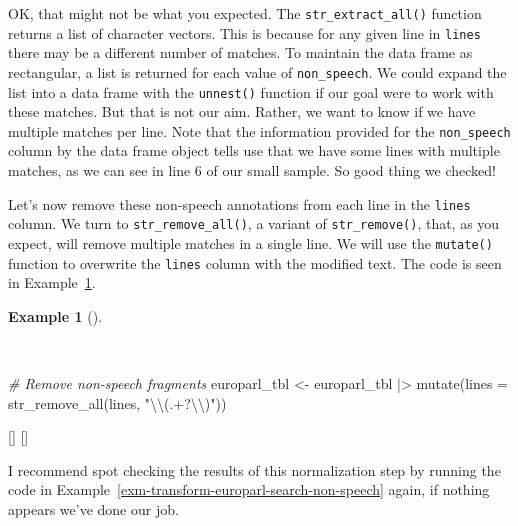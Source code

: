 \documentclass[
  letterpaper,
  krantz1]{latex/krantz-mod}
\newenvironment{Shaded}{\begin{snugshade}}{\end{snugshade}}
\newcommand{\AttributeTok}[1]{\textcolor[rgb]{0.00,0.00,0.00}{#1}}
\newcommand{\CommentTok}[1]{\textcolor[rgb]{0.00,0.00,0.00}{\textit{#1}}}
\newcommand{\FunctionTok}[1]{\textcolor[rgb]{0.00,0.00,0.00}{#1}}
\newcommand{\NormalTok}[1]{\textcolor[rgb]{0.00,0.00,0.00}{#1}}
\newcommand{\OtherTok}[1]{\textcolor[rgb]{0.00,0.00,0.00}{#1}}
\newcommand{\SpecialCharTok}[1]{\textcolor[rgb]{0.00,0.00,0.00}{#1}}
\newcommand{\StringTok}[1]{\textcolor[rgb]{0.00,0.00,0.00}{#1}}
\newcommand{\cindex}[1]{%
  \StrSubstitute{#1}{_}{\_}[\temp]%
  \index{\temp}%
}
\theoremstyle{definition}
\theoremstyle{definition}
\newtheorem{example}{Example}[chapter]
\theoremstyle{remark}
\begin{document}
OK, that might not be what you expected. The
\texttt{str\_extract\_all()} function returns a list of character
vectors. This is because for any given line in \texttt{lines} there may
be a different number of matches. To maintain the data frame as
rectangular, a list is returned for each value of \texttt{non\_speech}.
We could expand the list into a data frame with the \texttt{unnest()}
function if our goal were to work with these matches. But that is not
our aim. Rather, we want to know if we have multiple matches per line.
Note that the information provided for the \texttt{non\_speech} column
by the data frame object tells use that we have some lines with multiple
matches, as we can see in line 6 of our small sample. So good thing we
checked!

Let's now remove these non-speech annotations from each line in the
\texttt{lines} column. We turn to \texttt{str\_remove\_all()}, a variant
of \texttt{str\_remove()}, that, as you expect, will remove multiple
matches in a single line. We will use the \texttt{mutate()} function to
overwrite the \texttt{lines} column with the modified text. The code is
seen in Example~\ref{exm-transform-europarl-remove-non-speech}.

\begin{example}[]\protect\hypertarget{exm-transform-europarl-remove-non-speech}{}\label{exm-transform-europarl-remove-non-speech}

~

\begin{Shaded}
\begin{Highlighting}[numbers=left,,]
\CommentTok{\# Remove non{-}speech fragments}
\NormalTok{europarl\_tbl }\OtherTok{\textless{}{-}}
\NormalTok{  europarl\_tbl }\SpecialCharTok{|\textgreater{}}
  \FunctionTok{mutate}\NormalTok{(}\AttributeTok{lines =} \FunctionTok{str\_remove\_all}\NormalTok{(lines, }\StringTok{"}\SpecialCharTok{\textbackslash{}\textbackslash{}}\StringTok{(.+?}\SpecialCharTok{\textbackslash{}\textbackslash{}}\StringTok{)"}\NormalTok{))}
\end{Highlighting}
\end{Shaded}

\cindex{mutate()}\cindex{str_remove_all()}

\end{example}

I recommend spot checking the results of this normalization step by
running the code in
Example~\ref{exm-transform-europarl-search-non-speech} again, if nothing
appears we've done our job.
\end{document}

